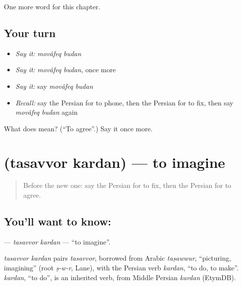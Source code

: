 \begin{grammarlens}[title={What you've built}]
One more word for this chapter.
\end{grammarlens}

\subsection*{Your turn}
\begin{itemize}
\raggedright
  \item \emph{Say it:} \emph{movâfeq budan}
  \item \emph{Say it:} \emph{movâfeq budan}, once more
  \item \emph{Say it:} say \emph{movâfeq budan}
  \item \emph{Recall:} say the Persian for to phone, then the Persian for to fix, then say \emph{movâfeq budan} again
\end{itemize}

\begin{tcolorbox}[breakable,colback=teal!4,colframe=teal!35!black,title={Before you move on}]
What does   mean? (\textquotedblleft{}To agree\textquotedblright{}.) Say it once more.
\end{tcolorbox}
\section[\texorpdfstring{\fa{تصور} \fa{کردن} (tasavvor kardan)}{تصور کردن (tasavvor kardan)}]{  (tasavvor kardan) — to imagine}

\label{lesson:FA-C258-tasavvor-kardan}



\begin{quote}
Before the new one: say the Persian for to fix, then the Persian for to agree.
\end{quote}

\subsection*{You'll want to know:  }
\textbf{ } — \emph{tasavvor kardan} — \textquotedblleft{}to imagine\textquotedblright{}.

\begin{cousinweb}
\emph{tasavvor kardan} pairs \emph{tasavvor}, borrowed from Arabic \emph{taṣawwur}, \textquotedblleft{}picturing, imagining\textquotedblright{} (root \emph{ṣ-w-r}, Lane), with the Persian verb \emph{kardan}, \textquotedblleft{}to do, to make\textquotedblright{}. \emph{kardan}, \textquotedblleft{}to do\textquotedblright{}, is an inherited verb, from Middle Persian \emph{kardan} (EtymDB).
\end{cousinweb}


